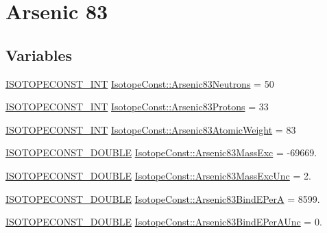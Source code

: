 \hypertarget{group___isotope_const-_arsenic-_as83}{}\section{Arsenic 83}
\label{group___isotope_const-_arsenic-_as83}
\subsection*{Variables}
\begin{DoxyCompactItemize}
\item 
\mbox{\hyperlink{group___isotope_const-_macros_ga5f18360b3e99483a35c32d789e62621c}{I\+S\+O\+T\+O\+P\+E\+C\+O\+N\+S\+T\+\_\+\+I\+NT}} \mbox{\hyperlink{group___isotope_const-_arsenic-_as83_gaa0b0c25dc9e67545fedffd524d86406e}{Isotope\+Const\+::\+Arsenic83\+Neutrons}} = 50
\item 
\mbox{\hyperlink{group___isotope_const-_macros_ga5f18360b3e99483a35c32d789e62621c}{I\+S\+O\+T\+O\+P\+E\+C\+O\+N\+S\+T\+\_\+\+I\+NT}} \mbox{\hyperlink{group___isotope_const-_arsenic-_as83_ga75bd5449dc6d67331aa9f858adca08ad}{Isotope\+Const\+::\+Arsenic83\+Protons}} = 33
\item 
\mbox{\hyperlink{group___isotope_const-_macros_ga5f18360b3e99483a35c32d789e62621c}{I\+S\+O\+T\+O\+P\+E\+C\+O\+N\+S\+T\+\_\+\+I\+NT}} \mbox{\hyperlink{group___isotope_const-_arsenic-_as83_gaa4cd369c4c3a9936a9be892ccb8e7aa9}{Isotope\+Const\+::\+Arsenic83\+Atomic\+Weight}} = 83
\item 
\mbox{\hyperlink{group___isotope_const-_macros_ga8f45a7272ce02c0b4c65c44636ed719a}{I\+S\+O\+T\+O\+P\+E\+C\+O\+N\+S\+T\+\_\+\+D\+O\+U\+B\+LE}} \mbox{\hyperlink{group___isotope_const-_arsenic-_as83_ga759e644732323df09fd9905223ea0dc4}{Isotope\+Const\+::\+Arsenic83\+Mass\+Exc}} = -\/69669.
\item 
\mbox{\hyperlink{group___isotope_const-_macros_ga8f45a7272ce02c0b4c65c44636ed719a}{I\+S\+O\+T\+O\+P\+E\+C\+O\+N\+S\+T\+\_\+\+D\+O\+U\+B\+LE}} \mbox{\hyperlink{group___isotope_const-_arsenic-_as83_gaabfb95137b04d7c136651d24043c8226}{Isotope\+Const\+::\+Arsenic83\+Mass\+Exc\+Unc}} = 2.
\item 
\mbox{\hyperlink{group___isotope_const-_macros_ga8f45a7272ce02c0b4c65c44636ed719a}{I\+S\+O\+T\+O\+P\+E\+C\+O\+N\+S\+T\+\_\+\+D\+O\+U\+B\+LE}} \mbox{\hyperlink{group___isotope_const-_arsenic-_as83_gaf356b8551573f8987c8a63c131833aee}{Isotope\+Const\+::\+Arsenic83\+Bind\+E\+PerA}} = 8599.
\item 
\mbox{\hyperlink{group___isotope_const-_macros_ga8f45a7272ce02c0b4c65c44636ed719a}{I\+S\+O\+T\+O\+P\+E\+C\+O\+N\+S\+T\+\_\+\+D\+O\+U\+B\+LE}} \mbox{\hyperlink{group___isotope_const-_arsenic-_as83_ga0e7ec09aa51fd7eb58c13e7ea170cc39}{Isotope\+Const\+::\+Arsenic83\+Bind\+E\+Per\+A\+Unc}} = 0.

\end{DoxyCompactItemize}
